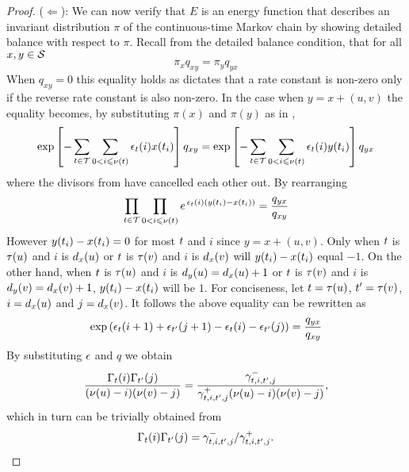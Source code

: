 \begin{proof}
  ($\Leftarrow$):
  We can now verify that $E$ is an energy function
  that describes an invariant distribution $\pi$
  of the continuous-time Markov chain
  by showing detailed balance with respect to $\pi$.
  Recall from 
  the detailed balance condition,
  that for all $x,y \in \mathcal{S}$ 
  \[ \pi_x q_{xy} = \pi_y q_{yx} \]
  When $q_{xy} = 0$ this equality holds %
  as  dictates that
  a rate constant is non-zero only if
  the reverse rate constant is also non-zero.
  In the case when $y = x + (u,v)$
  the equality becomes,
  by substituting $\pi(x)$ and $\pi(y)$ as in ,
  \begin{equation*}
    \operatorname*{exp}\left[
    -\sum_{t \in \mathcal{T}} \sum_{0 < i \leqslant \nu(t)}
    \epsilon_t(i) x(t_i)
    \right] q_{xy} =
    \operatorname*{exp}\left[
    -\sum_{t \in \mathcal{T}} \sum_{0 < i \leqslant \nu(t)}
    \epsilon_t(i) y(t_i)
    \right] q_{yx}
  \end{equation*}
  where the divisors from  have cancelled each other out.
  By rearranging
  \[ \prod_{t \in \mathcal{T}} \prod_{0 < i \leqslant \nu(t)}
     e^{\,\epsilon_t(i) (y(t_i) - x(t_i))} =
     \frac{q_{yx}}{q_{xy}} \]
  However $y(t_i) - x(t_i) = 0$ for most $t$ and $i$
  since $y = x + (u,v)$.
  Only when $t$ is $\tau(u)$ and $i$ is $d_x(u)$
  or $t$ is $\tau(v)$ and $i$ is $d_x(v)$
  will $y(t_i) - x(t_i)$ equal $-1$.
  On the other hand, when $t$ is $\tau(u)$
  and $i$ is $d_y(u) = d_x(u) + 1$
  or $t$ is $\tau(v)$
  and $i$ is $d_y(v) = d_x(v) + 1$,
  $y(t_i) - x(t_i)$ will be $1$.
  For conciseness, let $t = \tau(u)$, $t' = \tau(v)$,
  $i = d_x(u)$ and $j = d_x(v)$.
  It follows the above equality can be rewritten as
  \[ \operatorname*{exp}\left(
       \epsilon_{t}(i+1) +
       \epsilon_{t'}(j+1) -
       \epsilon_{t}(i) -
       \epsilon_{t'}(j) \right) =
     \frac{q_{yx}}{q_{xy}} \]
  By substituting $\epsilon$ and $q$ we obtain
  \[ \frac{
       \Gamma_t(i) \Gamma_{t'}(j)}{
       (\nu(u) - i) (\nu(v) - j)} =
     \frac{
       \gamma^-_{t,i,t',j}}{
       \gamma^+_{t,i,t',j}
       (\nu(u) - i) (\nu(v) - j)}, \]
  which in turn can be trivially obtained from
  \[ \Gamma_t(i) \Gamma_{t'}(j) =
     \gamma^-_{t,i,t',j} / \gamma^+_{t,i,t',j}.
     \qedhere \]
\end{proof}
